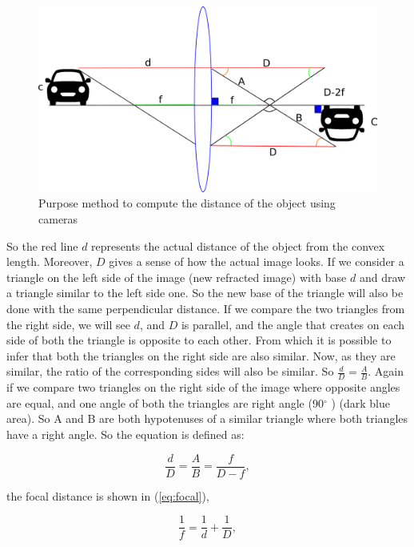 \begin{figure}[H]
\centering
\includegraphics[width=\textwidth]{imagens/desenhando.png}
\caption{Purpose method to compute the distance of the object using cameras}
\label{fig:distance}
\end{figure}


So the red line $d$ represents the actual distance of the object from the convex length. Moreover, $D$ gives a sense of how the actual image looks. If we consider a triangle on the left side of the image (new refracted image) with base $d$ and draw a triangle similar to the left side one. So the new base of the triangle will also be done with the same perpendicular distance. If we compare the two triangles from the right side, we will see $d$, and $D$ is parallel, and the angle that creates on each side of both the triangle is opposite to each other. From which it is possible to infer that both the triangles on the right side are also similar. Now, as they are similar, the ratio of the corresponding sides will also be similar. So $\frac{d}{D} = \frac{A}{B}$. Again if we compare two triangles on the right side of the image where opposite angles are equal, and one angle of both the triangles are right angle (90$^{\circ}$ ) (dark blue area). So A and B are both hypotenuses of a similar triangle where both triangles have a right angle. So the equation is defined as:

    \begin{equation}\label{eq:meausure}
        \frac{d}{D} = \frac{A}{B} = \frac{f}{D-f},
    \end{equation}

 the focal distance is shown in (\ref{eq:focal}), 

\begin{equation}\label{eq:focal}
    \frac{1}{f} = \frac{1}{d} + \frac{1}{D},
\end{equation}

